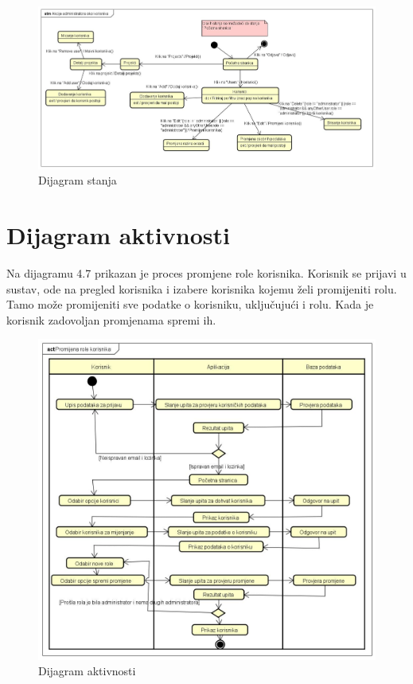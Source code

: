 			\begin{figure}[H]
				\includegraphics[scale=0.3]{slike/Dijagram stanja}
				\centering
				\caption{Dijagram stanja}
				\label{fig:stanja}
			\end{figure}

			\eject 
		
		\section{Dijagram aktivnosti}
			
			
			{ Na dijagramu 4.7 prikazan je proces promjene role korisnika. Korisnik se prijavi u sustav,
		  	ode na pregled korisnika i izabere korisnika kojemu želi promijeniti rolu. Tamo može promijeniti sve
			podatke o korisniku, uključujući i rolu. Kada je korisnik zadovoljan promjenama spremi ih.}

			\begin{figure}[H]
				\includegraphics[scale=0.3]{slike/Dijagram aktivnosti}
				\centering
				\caption{Dijagram aktivnosti}
				\label{fig:aktivnosti}
			\end{figure}

